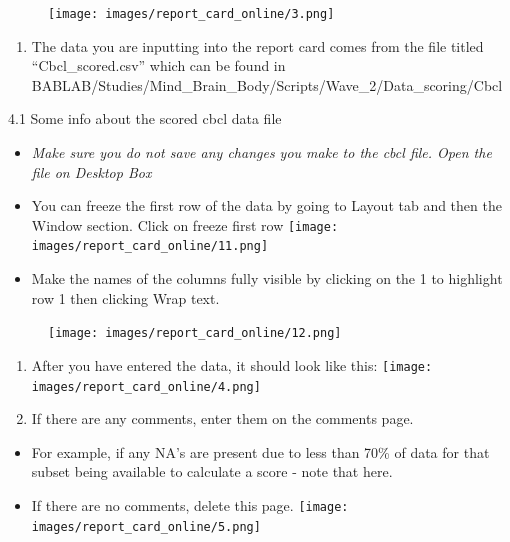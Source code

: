 \documentclass[
]{book}
\providecommand{\tightlist}{%
  \setlength{\itemsep}{0pt}\setlength{\parskip}{0pt}}
\begin{document}
\begin{figure}
\centering
\texttt{[image: images/report\_card\_online/3.png]}
\caption{}
\end{figure}

\begin{enumerate}
\def\labelenumi{\arabic{enumi}.}
\setcounter{enumi}{3}
\tightlist
\item
  The data you are inputting into the report card comes from the file titled ``Cbcl\_scored.csv'' which can be found in BABLAB/Studies/Mind\_Brain\_Body/Scripts/Wave\_2/Data\_scoring/Cbcl
\end{enumerate}

4.1 Some info about the scored cbcl data file

\begin{itemize}
\item
  \emph{Make sure you do not save any changes you make to the cbcl file. Open the file on Desktop Box}
\item
  You can freeze the first row of the data by going to Layout tab and then the Window section. Click on freeze first row
  \texttt{[image: images/report\_card\_online/11.png]}
\item
  Make the names of the columns fully visible by clicking on the 1 to highlight row 1 then clicking Wrap text.
\end{itemize}

\begin{figure}
\centering
\texttt{[image: images/report\_card\_online/12.png]}
\caption{}
\end{figure}

\begin{enumerate}
\def\labelenumi{\arabic{enumi}.}
\setcounter{enumi}{4}
\item
  After you have entered the data, it should look like this:
  \texttt{[image: images/report\_card\_online/4.png]}
\item
  If there are any comments, enter them on the comments page.
\end{enumerate}

\begin{itemize}
\tightlist
\item
  For example, if any NA's are present due to less than 70\% of data for that subset being available to calculate a score - note that here.
\item
  If there are no comments, delete this page.
  \texttt{[image: images/report\_card\_online/5.png]}
\end{itemize}
\end{document}
